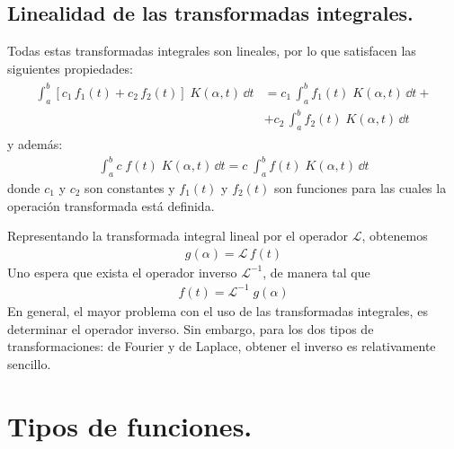 \subsection{Linealidad de las transformadas integrales.}
Todas estas transformadas integrales son lineales, por lo que satisfacen las siguientes propiedades:
\begin{align}
\begin{aligned}
\int_{a}^{b} [ c_{1} \, f_{1} (t) + c_{2} \, f_{2}(t)] \; K(\alpha, t) \, \dd{t} &= c_{1} \, \int_{a}^{b} f_{1} (t) \; K(\alpha, t) \, \dd{t} + \\
&+ c_{2} \, \int_{a}^{b} f_{2} (t) \; K(\alpha, t) \, \dd{t}
\end{aligned}
\label{eq:ecuacion_15_08} 
\end{align}
y además:
\begin{align}
\int_{a}^{b}  c \; f (t) \; K(\alpha, t) \, \dd t =  c \; \int_{a}^{b} f (t) \; K(\alpha, t) \, \dd{t}
\label{eq:ecuacion_15_09}
\end{align}
donde $c_{1}$ y $c_{2}$ son constantes y $f_{1}(t)$ y $f_{2}(t)$ son funciones para las cuales la operación transformada está definida.
\par
Representando la transformada integral lineal por el operador $\mathcal{L}$, obtenemos
\begin{align}
g (\alpha) = \mathcal{L} \, f(t)
\label{eq:ecuacion_15_10}
\end{align}
Uno espera que exista el operador inverso $\mathcal{L}^{-1}$, de manera tal que
\begin{align}
f(t) = \mathcal{L}^{-1}  \; g (\alpha)
\label{eq:ecuacion_15_11}
\end{align}
En general, el mayor problema con el uso de las transformadas integrales, es determinar el operador inverso. Sin embargo, para los dos tipos de transformaciones: de Fourier y de Laplace, obtener el inverso es relativamente sencillo.

\section{Tipos de funciones.}

